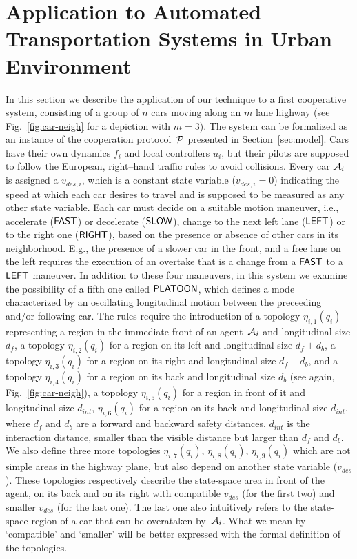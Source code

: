 
\newpage


\section{Application to Automated Transportation Systems in Urban Environment} 
\label{sec:example:highway}

In this section we describe the application of our technique to a first cooperative system, consisting of a group of $n$ cars moving along an $m$ lane highway (see Fig.~\ref{fig:car-neigh} for a depiction with $m=3$). The system can be formalized as an instance of the cooperation protocol~$\P$ presented in Section~\ref{sec:model}. Cars have their own dynamics $f_i$ and local controllers $u_i$, but their pilots are supposed to follow the European, right--hand traffic rules to avoid collisions. Every car $\ai$ is assigned a {\color{red} $v_{des, i}$, which is a constant state variable ($\dot{v_{des, i}} = 0$) indicating the speed at which each car desires to travel and is supposed to be measured as any other state variable.} Each car must decide on a suitable motion maneuver, i.e., accelerate ($\mfast$) or decelerate ($\mslow$), change to the next left lane ($\mleft$) or to the right one ($\mright$), based on the presence or absence of other cars in its neighborhood. E.g., the presence of a slower car in the
front, and a free lane on the left requires the execution of an
overtake that is a change from a $\mfast$ to a $\mleft$ maneuver. {\color{red} In addition to these four maneuvers, in this system we examine the possibility of a fifth one called $\mplatoon$, which defines a mode characterized by an oscillating longitudinal motion between the preceeding and/or following car.} The
rules require the introduction of a topology $\eta_{i,1}(q_i)$
representing a region in the immediate front of an agent~$\ai$ {\color{red} and longitudinal size $d_{f}$}, a
topology $\eta_{i,2}(q_i)$ for a region on its left {\color{red} and longitudinal size $d_f + d_b$}, a topology
$\eta_{i,3}(q_i)$ for a region on its right {\color{red} and longitudinal size $d_f + d_b$}, and a topology
$\eta_{i,4}(q_i)$ for a region on its back {\color{red} and longitudinal size $d_b$} (see again, Fig.~\ref{fig:car-neigh}), {\color{red}
a topology $\eta_{i,5}(q_i)$ for a region in front of it and longitudinal size $d_{int}$, $\eta_{i,6}(q_i)$ for a region on its back and longitudinal size $d_{int}$, where $d_f$ and $d_b$ are a forward and backward safety distances, $d_{int}$ is the interaction distance, smaller than the visible distance but larger than $d_f$ and $d_b$. We also define three more topologies $\eta_{i,7}(q_i)$, $\eta_{i,8}(q_i)$, $\eta_{i,9}(q_i)$ which are not simple areas in the highway plane, but also depend on another state variable ($v_{des}$). These topologies respectively describe the state-space area in front of the agent, on its back and on its right with compatible  $v_{des}$ (for the first two) and smaller $v_{des}$ (for the last one). The last one also intuitively refers to the state-space region of a car that can be overataken by~$\ai$. What we mean by `compatible' and `smaller' will be better expressed with the formal definition of the topologies. 
 }
